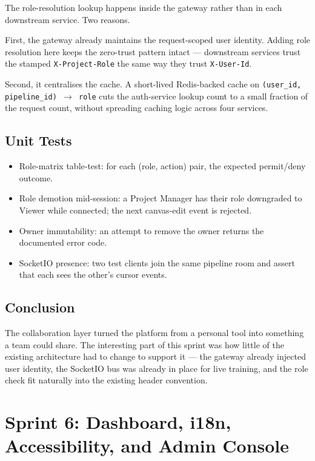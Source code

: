 \documentclass[12pt, a4paper, oneside]{report}
\begin{document}
The role-resolution lookup happens inside the gateway rather than in
each downstream service. Two reasons.

First, the gateway already maintains the request-scoped user
identity. Adding role resolution here keeps the zero-trust pattern
intact --- downstream services trust the stamped
\texttt{X-Project-Role} the same way they trust
\texttt{X-User-Id}.

Second, it centralises the cache. A short-lived Redis-backed cache
on \texttt{(user\_id, pipeline\_id) $\to$ role} cuts the
auth-service lookup count to a small fraction of the request count,
without spreading caching logic across four services.

\section{Unit Tests}

\begin{itemize}
    \item Role-matrix table-test: for each (role, action) pair, the
        expected permit/deny outcome.
    \item Role demotion mid-session: a Project Manager has their
        role downgraded to Viewer while connected; the next
        canvas-edit event is rejected.
    \item Owner immutability: an attempt to remove the owner
        returns the documented error code.
    \item SocketIO presence: two test clients join the same
        pipeline room and assert that each sees the other's
        cursor events.
\end{itemize}

\section*{Conclusion}

The collaboration layer turned the platform from a personal tool
into something a team could share. The interesting part of this
sprint was how little of the existing architecture had to change to
support it --- the gateway already injected user identity, the
SocketIO bus was already in place for live training, and the role
check fit naturally into the existing header convention.

\chapter{Sprint 6: Dashboard, i18n, Accessibility, and Admin Console}
\end{document}
